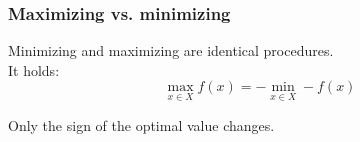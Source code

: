 \begin{frame}
 \frametitle{Maximizing vs. minimizing}
 Minimizing and maximizing are identical procedures.\\ It holds:
 \[
  \max_{x\in X} f(x) = -\min_{x\in X} -f(x)
 \]
 
 Only the sign of the optimal value changes.
\end{frame}
